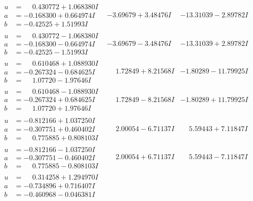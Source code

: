 \documentclass[1p]{elsarticle_modified}
\theoremstyle{definition}
\begin{document}
$$\begin{array}{c|c|c}
\begin{aligned}
u &= \phantom{-}0.430772 + 1.068380 I \\
a &= -0.168300 + 0.664974 I \\
b &= -0.42525 + 1.51993 I\end{aligned}
 & -3.69679 + 3.48476 I & -13.31039 - 2.89782 I \\ \hline\begin{aligned}
u &= \phantom{-}0.430772 - 1.068380 I \\
a &= -0.168300 - 0.664974 I \\
b &= -0.42525 - 1.51993 I\end{aligned}
 & -3.69679 - 3.48476 I & -13.31039 + 2.89782 I \\ \hline\begin{aligned}
u &= \phantom{-}0.610468 + 1.088930 I \\
a &= -0.267324 - 0.684625 I \\
b &= \phantom{-}1.07720 - 1.97646 I\end{aligned}
 & \phantom{-}1.72849 + 8.21568 I & -1.80289 - 11.79925 I \\ \hline\begin{aligned}
u &= \phantom{-}0.610468 - 1.088930 I \\
a &= -0.267324 + 0.684625 I \\
b &= \phantom{-}1.07720 + 1.97646 I\end{aligned}
 & \phantom{-}1.72849 - 8.21568 I & -1.80289 + 11.79925 I \\ \hline\begin{aligned}
u &= -0.812166 + 1.037250 I \\
a &= -0.307751 + 0.460402 I \\
b &= \phantom{-}0.775885 + 0.808103 I\end{aligned}
 & \phantom{-}2.00054 - 6.71137 I & \phantom{-}5.59443 + 7.11847 I \\ \hline\begin{aligned}
u &= -0.812166 - 1.037250 I \\
a &= -0.307751 - 0.460402 I \\
b &= \phantom{-}0.775885 - 0.808103 I\end{aligned}
 & \phantom{-}2.00054 + 6.71137 I & \phantom{-}5.59443 - 7.11847 I \\ \hline\begin{aligned}
u &= \phantom{-}0.314258 + 1.294970 I \\
a &= -0.734896 + 0.716407 I \\
b &= -0.460968 - 0.046381 I\end{aligned}

\end{array}$$
\end{document}
